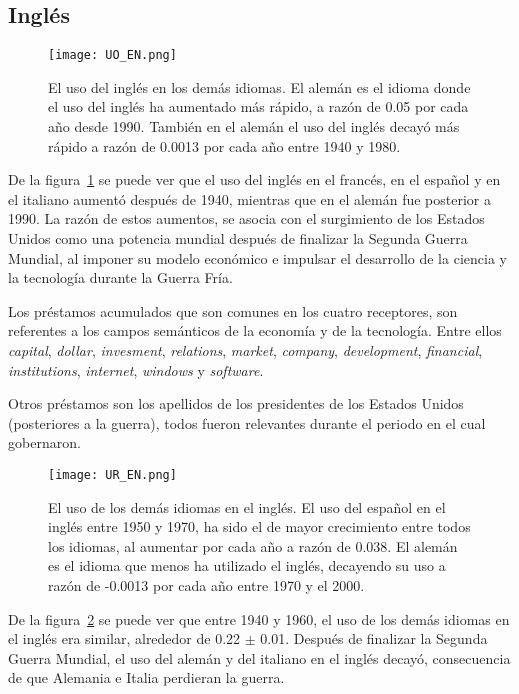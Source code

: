 \subsection{Inglés} %

\begin{figure}[h!]
	\centering
	\texttt{[image: UO\_EN.png]}
	\caption{El uso del inglés en los demás idiomas. El alemán es el idioma donde el uso del inglés ha aumentado más rápido, a razón de  0.05 por cada año desde 1990. También en el alemán el uso del inglés decayó más rápido a razón de 0.0013 por cada año entre 1940 y 1980.}
	\label{fig.UO_EN}
\end{figure} 


De la figura~\ref{fig.UO_EN} se puede ver que el uso del inglés en el francés, en el español y en el italiano aumentó después de 1940, mientras que en el alemán fue posterior a 1990.  La razón de estos aumentos, se asocia con el surgimiento de los Estados Unidos como una potencia mundial después de finalizar la Segunda Guerra Mundial,  al  imponer  su modelo económico e impulsar el desarrollo de la ciencia y la tecnología durante la Guerra Fría.

Los préstamos acumulados  que son comunes en los cuatro receptores, son referentes a los campos semánticos de la economía y de la tecnología. Entre ellos \textit{capital}, \textit{dollar}, \textit{invesment}, \textit{relations}, \textit{market}, \textit{company}, \textit{development}, \textit{financial},  \textit{institutions}, \textit{internet}, \textit{windows} y \textit{software}. 

Otros préstamos son los apellidos de los presidentes de los Estados Unidos (posteriores a la guerra), todos fueron relevantes durante el periodo en el cual gobernaron. 


\begin{figure}[h!]
	\centering
	\texttt{[image: UR\_EN.png]}
	\caption{El uso de los demás idiomas en el inglés. El uso del español en el inglés entre 1950 y 1970, ha sido el de mayor crecimiento entre todos los idiomas, al aumentar por cada año a razón de 0.038.  El alemán es el idioma que menos ha utilizado el inglés, decayendo su uso a razón de -0.0013 por cada año entre 1970 y el 2000.}
	\label{fig.UR_EN}
\end{figure} 


De la figura~\ref{fig.UR_EN} se puede ver que entre 1940 y 1960, el uso de los demás idiomas en el inglés era similar, alrededor de 0.22 $\pm$ 0.01. Después de finalizar la Segunda Guerra Mundial, el uso del alemán y del italiano en el inglés decayó,  consecuencia de que Alemania e Italia perdieran la guerra.

